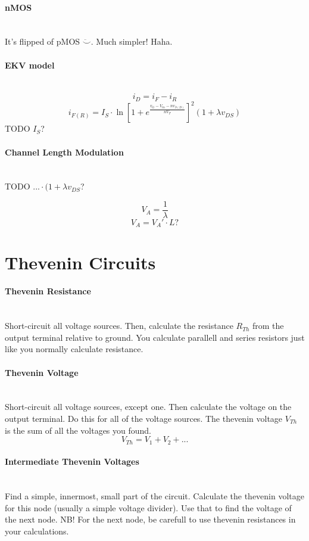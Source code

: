 \documentclass[twocolumn]{article}
\begin{document}
    \paragraph{nMOS} \hfill \\
      It's flipped of pMOS $\ddot\smile$. Much simpler! Haha.
    \paragraph{EKV model} \hfill \\
      $$i_D = i_F - i_R$$
      $$i_{F(R)} = I_S \cdot
                   \ln \left[ 1 + e^{\frac{v_G - V_{tn} - nv_{S(D)}}{nV_T}}
                       \right] ^2
                   (1 + \lambda v_{DS})$$
      TODO $I_S$?
    \paragraph{Channel Length Modulation} \hfill \\
      TODO $... \cdot (1 + \lambda v_{DS}$?

      $$V_A = \frac{1}{\lambda}$$
      $$V_A = V_A' \cdot L?$$

  \section{Thevenin Circuits}
    \paragraph{Thevenin Resistance} \hfill \\
      Short-circuit all voltage sources.
      Then, calculate the resistance $R_{Th}$ from the output terminal relative
      to ground.
      You calculate parallell and series resistors just like you normally
     calculate resistance.
    \paragraph{Thevenin Voltage} \hfill \\
      Short-circuit all voltage sources, except one.
      Then calculate the voltage on the output terminal.
      Do this for all of the voltage sources.
      The thevenin voltage $V_{Th}$ is the sum of all the voltages you found.
      $$V_{Th} = V_1 + V_2 + ...$$
    \paragraph{Intermediate Thevenin Voltages} \hfill \\
      Find a simple, innermost, small part of the circuit.
      Calculate the thevenin voltage for this node (usually a simple voltage
      divider).
      Use that to find the voltage of the next node.
      NB! For the next node, be carefull to use thevenin resistances in
      your calculations.
\end{document}
